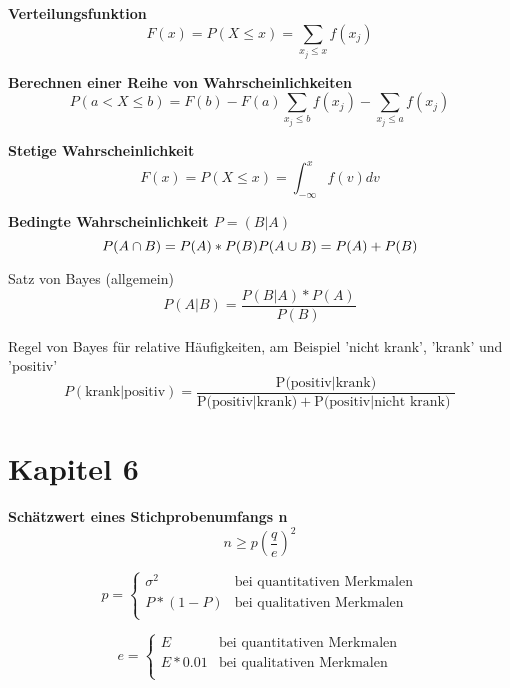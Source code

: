 \documentclass[11pt,twocolumn,fleqn]{article}
\begin{document}
\textbf{Verteilungsfunktion}
\begin{equation*}
F(x)=P(X \leq x)=\sum_{x_j \leq x }f(x_j)
\end{equation*}

\textbf{Berechnen einer Reihe von Wahrscheinlichkeiten}
\begin{equation*}
P(a<X \leq b) = F(b)-F(a) \sum_{x_j \leq b }f(x_j) - \sum_{x_j \leq a }f(x_j)
\end{equation*}

\textbf{Stetige Wahrscheinlichkeit}
\begin{equation*}
F(x) = P(X \leq x) = \int^x_{-\infty} f(v)dv
\end{equation*}

\textbf{Bedingte Wahrscheinlichkeit $P=(B|A)$}
\begin{equation*}
P(A \cap B) = P(A) * P(B)\\
P(A \cup B) = P(A) + P(B)
\end{equation*}

Satz von Bayes (allgemein)
\begin{equation*}
P(A|B) = \frac{ P(B|A) * P(A) }{ P(B) }
\end{equation*}


Regel von Bayes für relative Häufigkeiten, am Beispiel 'nicht krank', 'krank' und 'positiv'
\begin{equation*}
P(\text{krank}|\text{positiv})=\frac{\text{P(positiv}|\text{krank)}}{\text{P(positiv}|\text{krank)} + \text{P(positiv}|\text{nicht krank) }}
\end{equation*}


\section{Kapitel 6}

\textbf{Schätzwert eines Stichprobenumfangs n}
\begin{equation*}
n \geq p (\frac{q}{e})^2
\end{equation*}

\begin{equation*}
p = \begin{cases} 
\sigma^2 & \text{bei quantitativen Merkmalen} \\ 
P*(1-P) & \text{bei qualitativen Merkmalen}  \\ 
\end{cases}
\end{equation*}

\begin{equation*}
e = \begin{cases} 
E & \text{bei quantitativen Merkmalen} \\ 
E*0.01 & \text{bei qualitativen Merkmalen}  \\ 
\end{cases}
\end{equation*}
\end{document}
